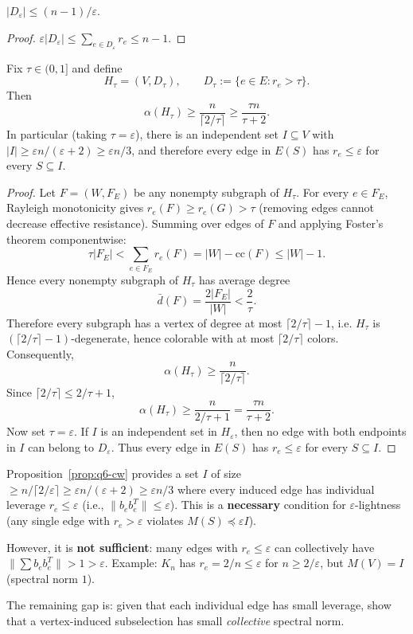 \begin{lemma}\label{lem:q6-Dsize}
$|D_\varepsilon|\le(n-1)/\varepsilon$.
\end{lemma}
\begin{proof}
$\varepsilon|D_\varepsilon|\le\sum_{e\in D_\varepsilon}r_e\le n-1$.
\end{proof}

\begin{proposition}\label{prop:q6-cw}
Fix $\tau\in(0,1]$ and define
\[
H_\tau=(V,D_\tau),\qquad D_\tau:=\{e\in E:r_e>\tau\}.
\]
Then
\[
\alpha(H_\tau)\ge \frac{n}{\lceil 2/\tau\rceil}\ge \frac{\tau n}{\tau+2}.
\]
In particular (taking $\tau=\varepsilon$), there is an independent set
$I\subseteq V$ with $|I|\ge \varepsilon n/(\varepsilon+2)\ge \varepsilon n/3$, and therefore every edge in
$E(S)$ has $r_e\le \varepsilon$ for every $S\subseteq I$.
\end{proposition}

\begin{proof}
Let $F=(W,F_E)$ be any nonempty subgraph of $H_\tau$.
For every $e\in F_E$, Rayleigh monotonicity gives
$r_e(F)\ge r_e(G)>\tau$ (removing edges cannot decrease effective
resistance). Summing over edges of $F$ and applying Foster's theorem
componentwise:
\[
\tau |F_E|<\sum_{e\in F_E} r_e(F)=|W|-\mathrm{cc}(F)\le |W|-1.
\]
Hence every nonempty subgraph of $H_\tau$ has average degree
\[
\bar d(F)=\frac{2|F_E|}{|W|}<\frac{2}{\tau}.
\]
Therefore every subgraph has a vertex of degree at most
$\lceil 2/\tau\rceil-1$, i.e. $H_\tau$ is
$(\lceil 2/\tau\rceil-1)$-degenerate, hence colorable with at most
$\lceil 2/\tau\rceil$ colors. Consequently,
\[
\alpha(H_\tau)\ge \frac{n}{\lceil 2/\tau\rceil}.
\]
Since $\lceil 2/\tau\rceil\le 2/\tau+1$,
\[
\alpha(H_\tau)\ge \frac{n}{2/\tau+1}=\frac{\tau n}{\tau+2}.
\]
Now set $\tau=\varepsilon$. If $I$ is an independent set in
$H_\varepsilon$, then no edge with both endpoints in $I$ can belong to
$D_\varepsilon$. Thus every edge in $E(S)$ has $r_e\le \varepsilon$ for
every $S\subseteq I$.
\end{proof}

\begin{remark}
Proposition~\ref{prop:q6-cw} provides a set $I$ of size
$\ge n/\lceil 2/\varepsilon\rceil\ge \varepsilon n/(\varepsilon+2)\ge\varepsilon n/3$
where every induced edge has individual leverage $r_e\le\varepsilon$ (i.e., $\|b_eb_e^T\|\le\varepsilon$). This is a \textbf{necessary} condition for $\varepsilon$-lightness (any single edge with $r_e>\varepsilon$ violates $M(S)\preceq\varepsilon I$).

However, it is \textbf{not sufficient}: many edges with $r_e\le\varepsilon$ can collectively have $\|\sum b_eb_e^T\|>1>\varepsilon$. Example: $K_n$ has $r_e=2/n\le\varepsilon$ for $n\ge 2/\varepsilon$, but $M(V)=I$ (spectral norm $1$).

The remaining gap is: given that each individual edge has small leverage, show that a vertex-induced subselection has small \emph{collective} spectral norm.
\end{remark}


